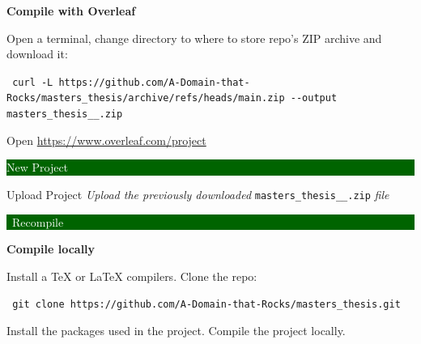 \noindent \textbf{Compile with Overleaf}

\noindent Open a terminal, change directory to where to store repo's ZIP archive and download it:

\noindent\colorbox{lightestgray}{
	\parbox{1\linewidth-9pt}{%
		\texttt{\tiny\faDollarSign\large\ curl -L https://github.com/A-Domain-that-Rocks/masters\_thesis/archive/refs/heads/main.zip -{}-out\-put mas\-ters\_the\-sis\_\myauthorname\_\myauthorsurname.zip}
	}%
}%

\medskip

\noindent Open \url{https://www.overleaf.com/project}  \colorbox{darkgreen}{\parbox{3cm}{\centering \textcolor{white}{New Project}}}  Upload Project  \textit{Upload the previously down\-load\-ed} \texttt{mas\-ters\_the\-sis\_\myauthorname\_\myauthorsurname.zip} \textit{file}  \colorbox{darkgreen}{\parbox{3cm}{\centering \textcolor{white}{\faSync*\ Recompile}}}
\bigskip

\noindent \textbf{Compile locally}

\noindent Install a \TeX{} or \LaTeX{} \glspl{compiler}. Clone the repo:

\noindent\colorbox{lightestgray}{
	\parbox{1\linewidth-9pt}{%
		\texttt{\tiny\faDollarSign\large\ git clone https://github.com/A-Domain-that-Rocks/masters\_thesis.git}
	}%
}%

\medskip

\noindent Install the packages used in the project. Compile the project locally.

\newpage
\thispagestyle{empty}
